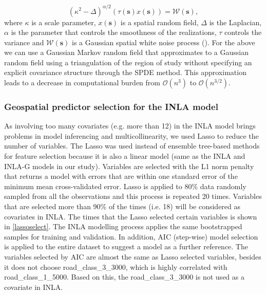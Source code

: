 \documentclass{article}
\begin{document}
\begin{equation}\label{eqn:eq9}
(\kappa^{2} - \Delta)^{\alpha/2}(\tau(\boldsymbol{s}) x(\boldsymbol{s})) = \boldsymbol{\mathcal{W}(s)},
\end{equation}
where $\kappa$ is a scale parameter, $x(\boldsymbol{s})$ is a spatial random field, $\Delta$ is the Laplacian, $\alpha$ is the parameter that controls the smoothness of the realizations, $\tau$ controls the variance and $\boldsymbol{\mathcal{W}(s)}$  is a Gaussian spatial white noise process (\cite{lindgren2015bayesian}). For the above we can use a Gaussian Markov random field that approximates to a Gaussian random field using a triangulation of the region of study without specifying an explicit covariance structure through the SPDE method. This approximation leads to a decrease in computational burden from $\mathcal{O}(n^{3})$ to $\mathcal{O}(n^{3/2})$. 



\subsubsection{Geospatial predictor selection for the INLA model} 

As involving too many covariates (e.g. more than 12) in the INLA model brings problems in model inferencing and multicollinearity, we used Lasso to reduce the number of variables. The Lasso was used instead of ensemble tree-based methods for feature selection because it is also a linear model (same as the INLA and INLA-G models in our study). Variables are selected with the L1 norm penalty that returns a model with errors that are within one standard error of the minimum mean cross-validated error. Lasso is applied to 80\% data randomly sampled from all the observations and this process is repeated  20 times. Variables that are selected more than 90\% of the times (i.e. 18) will be considered as covariates in INLA. The times that the Lasso selected certain variables is shown in \cref{lassoselect}. The INLA modelling process applies the same bootstrapped samples for training and validation.  In addition, AIC (step-wise) model selection is applied to the entire dataset to suggest a model as a further reference. The variables selected by AIC are almost the same as Lasso selected variables, besides it does not choose road\_class\_3\_3000, which is highly correlated with  road\_class\_1\_5000. Based on this, the road\_class\_3\_3000 is not used as a covariate in INLA.  
\end{document}
